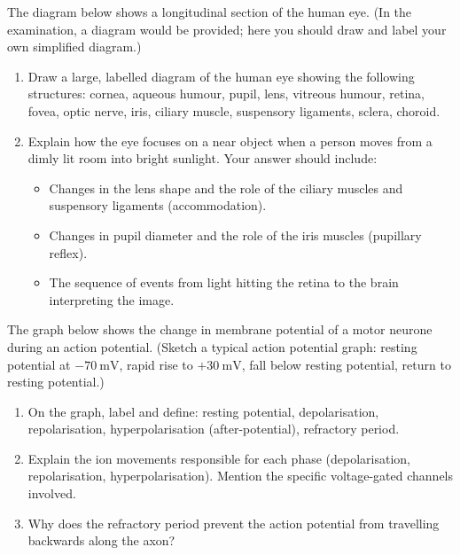 \documentclass[11pt]{article}
\newcounter{popsec}
\newcounter{popsub}
\newcommand{\courssub}[1]{%
  \stepcounter{popsub}%
  \par\vspace{9pt}\noindent{\popxbold\fontsize{11.5}{13}\selectfont\color{popink}{\color{poporange}\thepopsec.\thepopsub}\hspace{6pt}#1}\par\nopagebreak\vspace{4pt}
}
\begin{document}
\courssub{I practise}

\begin{exercice}
The diagram below shows a longitudinal section of the human eye. (In the examination, a diagram would be provided; here you should draw and label your own simplified diagram.)

\begin{enumerate}
\item Draw a large, labelled diagram of the human eye showing the following structures: cornea, aqueous humour, pupil, lens, vitreous humour, retina, fovea, optic nerve, iris, ciliary muscle, suspensory ligaments, sclera, choroid.
\item Explain how the eye focuses on a near object when a person moves from a dimly lit room into bright sunlight. Your answer should include:
\begin{itemize}
\item Changes in the lens shape and the role of the ciliary muscles and suspensory ligaments (accommodation).
\item Changes in pupil diameter and the role of the iris muscles (pupillary reflex).
\item The sequence of events from light hitting the retina to the brain interpreting the image.
\end{itemize}
\end{enumerate}
\end{exercice}

\begin{exercice}
The graph below shows the change in membrane potential of a motor neurone during an action potential. (Sketch a typical action potential graph: resting potential at $-70\ \mathrm{mV}$, rapid rise to $+30\ \mathrm{mV}$, fall below resting potential, return to resting potential.)

\begin{enumerate}
\item On the graph, label and define: resting potential, depolarisation, repolarisation, hyperpolarisation (after-potential), refractory period.
\item Explain the ion movements responsible for each phase (depolarisation, repolarisation, hyperpolarisation). Mention the specific voltage-gated channels involved.
\item Why does the refractory period prevent the action potential from travelling backwards along the axon?
\end{enumerate}
\end{exercice}
\end{document}
